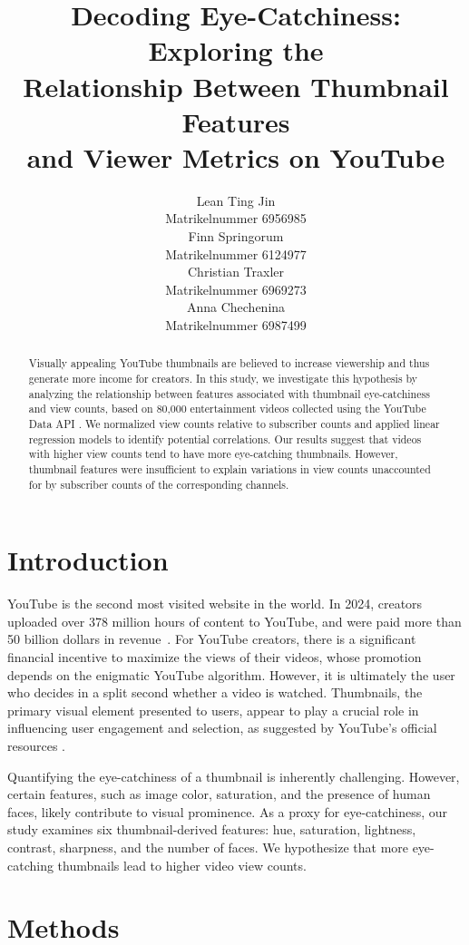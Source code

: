 \documentclass{article}
\title{Decoding Eye-Catchiness: Exploring the\\Relationship Between Thumbnail Features\\and Viewer Metrics on YouTube}
\author{%
  Lean Ting Jin\\
  Matrikelnummer 6956985\\
  \And
  Finn Springorum\\
  Matrikelnummer 6124977\\
  \AND
  Christian Traxler\\
  Matrikelnummer 6969273\\
  \And
  Anna Chechenina\\
  Matrikelnummer 6987499\\
}
\begin{document}
\maketitle

\begin{abstract}
Visually appealing YouTube thumbnails are believed to increase viewership and thus generate more income for creators. In this study, we investigate this hypothesis by analyzing the relationship between features associated with thumbnail eye-catchiness and view counts, based on 80,000 entertainment videos collected using the YouTube Data API \cite{youtubeapi}. We normalized view counts relative to subscriber counts and applied linear regression models to identify potential correlations. Our results suggest that videos with higher view counts tend to have more eye-catching thumbnails. However, thumbnail features were insufficient to explain variations in view counts unaccounted for by subscriber counts of the corresponding channels.
\end{abstract}

\section{Introduction}
YouTube is the second most visited website in the world. In 2024, creators uploaded over 378 million hours of content to YouTube, and were paid more than 50 billion dollars in revenue~\cite{youtube-stats}. For YouTube creators, there is a significant financial incentive to maximize the views of their videos, whose promotion depends on the enigmatic YouTube algorithm. However, it is ultimately the user who decides in a split second whether a video is watched. Thumbnails, the primary visual element presented to users, appear to play a crucial role in influencing user engagement and selection, as suggested by YouTube's official resources \cite{YouTubeThumbnail}.

Quantifying the eye-catchiness of a thumbnail is inherently challenging. However, certain features, such as image color, saturation, and the presence of human faces, likely contribute to visual prominence. As a proxy for eye-catchiness, our study examines six thumbnail-derived features: hue, saturation, lightness, contrast, sharpness, and the number of faces. We hypothesize that more eye-catching thumbnails lead to higher video view counts.

\section{Methods}
\end{document}
